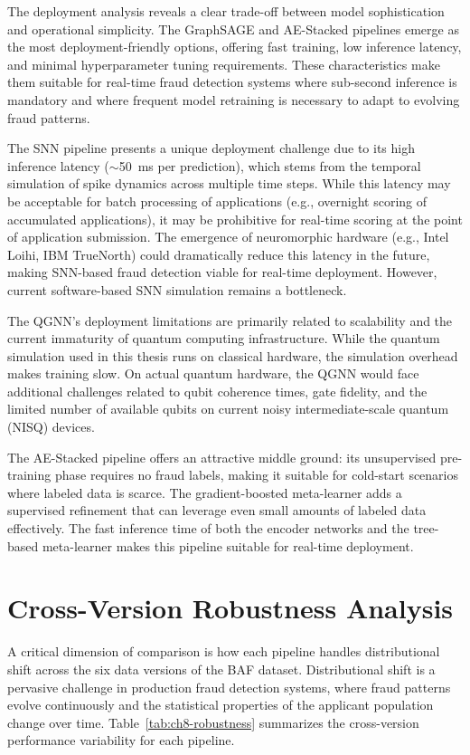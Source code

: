 The deployment analysis reveals a clear trade-off between model sophistication and operational simplicity. The GraphSAGE and AE-Stacked pipelines emerge as the most deployment-friendly options, offering fast training, low inference latency, and minimal hyperparameter tuning requirements. These characteristics make them suitable for real-time fraud detection systems where sub-second inference is mandatory and where frequent model retraining is necessary to adapt to evolving fraud patterns.

The SNN pipeline presents a unique deployment challenge due to its high inference latency ($\sim$50~ms per prediction), which stems from the temporal simulation of spike dynamics across multiple time steps. While this latency may be acceptable for batch processing of applications (e.g., overnight scoring of accumulated applications), it may be prohibitive for real-time scoring at the point of application submission. The emergence of neuromorphic hardware (e.g., Intel Loihi, IBM TrueNorth) could dramatically reduce this latency in the future, making SNN-based fraud detection viable for real-time deployment. However, current software-based SNN simulation remains a bottleneck.

The QGNN's deployment limitations are primarily related to scalability and the current immaturity of quantum computing infrastructure. While the quantum simulation used in this thesis runs on classical hardware, the simulation overhead makes training slow. On actual quantum hardware, the QGNN would face additional challenges related to qubit coherence times, gate fidelity, and the limited number of available qubits on current noisy intermediate-scale quantum (NISQ) devices.

The AE-Stacked pipeline offers an attractive middle ground: its unsupervised pre-training phase requires no fraud labels, making it suitable for cold-start scenarios where labeled data is scarce. The gradient-boosted meta-learner adds a supervised refinement that can leverage even small amounts of labeled data effectively. The fast inference time of both the encoder networks and the tree-based meta-learner makes this pipeline suitable for real-time deployment.

\section{Cross-Version Robustness Analysis}

A critical dimension of comparison is how each pipeline handles distributional shift across the six data versions of the BAF dataset. Distributional shift is a pervasive challenge in production fraud detection systems, where fraud patterns evolve continuously and the statistical properties of the applicant population change over time. Table~\ref{tab:ch8-robustness} summarizes the cross-version performance variability for each pipeline.

